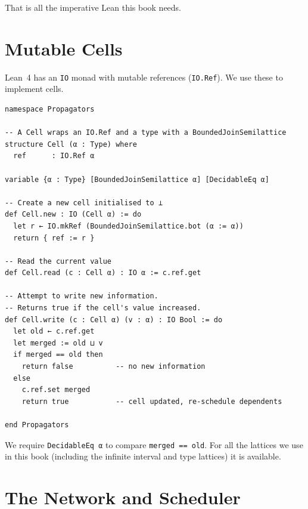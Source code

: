 \documentclass[12pt, a4paper, openright]{book}
\theoremstyle{thmstyle}
\theoremstyle{defstyle}
\newcommand{\lc}[1]{\texttt{#1}}
\newenvironment{notebox}{%
  \begin{tcolorbox}[notebox]%
}{\end{tcolorbox}}
\begin{document}
That is all the imperative Lean this book needs.

\section{Mutable Cells}

Lean~4 has an \lc{IO} monad with mutable references (\lc{IO.Ref}). We use
these to implement cells.

\begin{verbatim}
namespace Propagators

-- A Cell wraps an IO.Ref and a type with a BoundedJoinSemilattice
structure Cell (α : Type) where
  ref      : IO.Ref α

variable {α : Type} [BoundedJoinSemilattice α] [DecidableEq α]

-- Create a new cell initialised to ⊥
def Cell.new : IO (Cell α) := do
  let r ← IO.mkRef (BoundedJoinSemilattice.bot (α := α))
  return { ref := r }

-- Read the current value
def Cell.read (c : Cell α) : IO α := c.ref.get

-- Attempt to write new information.
-- Returns true if the cell's value increased.
def Cell.write (c : Cell α) (v : α) : IO Bool := do
  let old ← c.ref.get
  let merged := old ⊔ v
  if merged == old then
    return false          -- no new information
  else
    c.ref.set merged
    return true           -- cell updated, re-schedule dependents

end Propagators
\end{verbatim}

\begin{notebox}
  We require \lc{DecidableEq α} to compare \lc{merged == old}. For all the
  lattices we use in this book (including the infinite interval and type
  lattices) it is available.
\end{notebox}

\section{The Network and Scheduler}
\end{document}
